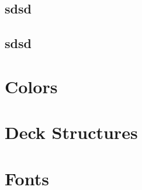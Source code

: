 \documentclass[aspectratio=169, sectionpages, codemintedoverleaf, bibref]{beamer}
\begin{document}
\subsection{sdsd}



\subsection{sdsd}






\section{Colors}





\section{Deck Structures}










\section{Fonts}



\end{document}
